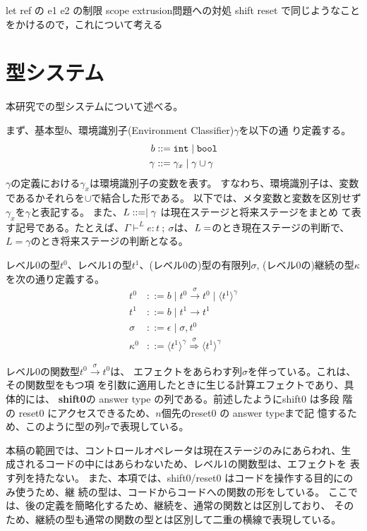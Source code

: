 \documentclass[T]{compsoft}
\newcommand\Shiftz{\textbf{shift0}}
\newcommand\intT{\mbox{\texttt{int}}}
\newcommand\boolT{\mbox{\texttt{bool}}}
\newcommand\codeT[2]{\langle{#1}\rangle^{#2}}
\newcommand\funT[3]{{#1} \stackrel{#3}{\rightarrow} {#2}}
\newcommand\contT[3]{{#1} \stackrel{#3}{\Rightarrow} {#2}}
\theoremstyle{break}
\begin{document}
let ref の e1 e2 の制限 scope extrusion問題への対処
shift reset で同じようなことをかけるので，これについて考える


\section{型システム}

本研究での型システムについて述べる。

まず、基本型$b$、環境識別子(Environment Classifier)$\gamma$を以下の通
り定義する。
\begin{align*}
  b & ::= \intT \mid \boolT \\
  \gamma & ::= \gamma_x \mid \gamma \cup \gamma 
\end{align*}
$\gamma$の定義における$\gamma_x$は環境識別子の変数を表す。
すなわち、環境識別子は、変数であるかそれらを$\cup$で結合した形である。
以下では、メタ変数と変数を区別せず$\gamma_x$を$\gamma$と表記する。
また、$L ::= \empty \mid \gamma$ は現在ステージと将来ステージをまとめ
て表す記号である。たとえば、$\Gamma \vdash^L
e:t~;~\sigma$は、$L=\empty$のとき現在ステージの判断で、
$L=\gamma$のとき将来ステージの判断となる。

レベル0の型$t^0$、レベル1の型$t^1$、(レベル0の)型の有限列$\sigma$,
(レベル0の)継続の型$\kappa$を次の通り定義する。
\begin{align*}
  t^0 & ::= b \mid \funT{t^0}{t^0}{\sigma} \mid \codeT{t^1}{\gamma} \\
  t^1 & ::= b \mid t^1 \to t^1 \\
  \sigma & ::= \epsilon \mid \sigma,t^0 \\
  \kappa^0 & ::= \contT{\codeT{t^1}{\gamma}}{\codeT{t^1}{\gamma}}{\sigma}
\end{align*}

レベル0の関数型$\funT{t^0}{t^0}{\sigma}$は、
エフェクトをあらわす列$\sigma$を伴っている。これは、その関数型をもつ項
を引数に適用したときに生じる計算エフェクトであり、具体的には、
\Shiftz の answer type の列である。前述したようにshift0 は多段
階の reset0 にアクセスできるため、$n$個先のreset0 の answer typeまで記
憶するため、このように型の列$\sigma$で表現している。

本稿の範囲では、コントロールオペレータは現在ステージのみにあらわれ、生
成されるコードの中にはあらわないため、レベル1の関数型は、エフェクトを
表す列を持たない。
また、本項では、shift0/reset0 はコードを操作する目的にのみ使うため、継
続の型は、コードからコードへの関数の形をしている。
ここでは、後の定義を簡略化するため、継続を、通常の関数とは区別しており、
そのため、継続の型も通常の関数の型とは区別して二重の横線で表現している。
\end{document}
